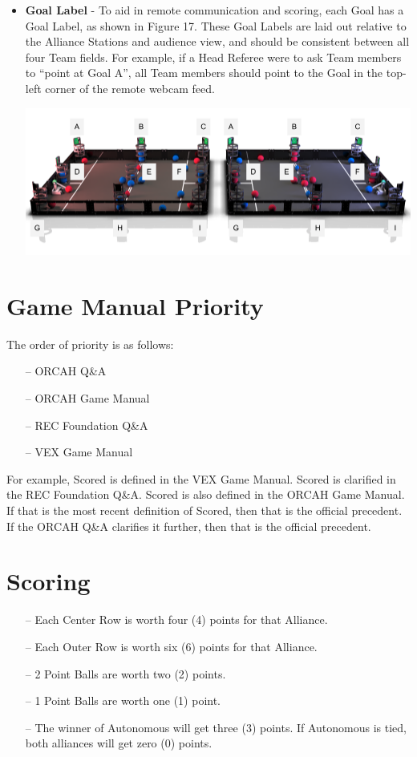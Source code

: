 \documentclass[letterpaper, 12pt]{article}
\begin{document}
\begin{itemize}[label={}]
\item\textbf{Goal Label} - To aid in remote communication and scoring, each Goal has a Goal Label, as shown in Figure 17. These Goal Labels are laid out relative to the Alliance Stations and audience view, and should be consistent between all four Team fields. For example, if a Head Referee were to ask Team members to “point at Goal A”, all Team members should point to the Goal in the top-left corner of the remote webcam feed.

\begin{center}
\includegraphics[scale=0.5]{labels}
\end{center}

\end{itemize}

\section{Game Manual Priority}

The order of priority is as follows:
\begin{itemize}
\item[--] ORCAH Q\&A
\item[--] ORCAH Game Manual
\item[--] REC Foundation Q\&A
\item[--] VEX Game Manual
\end{itemize}

For example, Scored is defined in the VEX Game Manual.  Scored is clarified in the REC Foundation Q\&A.  Scored is also defined in the ORCAH Game Manual.  If that is the most recent definition of Scored, then that is the official precedent.  If the ORCAH Q\&A clarifies it further, then that is the official precedent.

\section{Scoring}
\begin{itemize}
\item[--] Each Center Row is worth four (4) points for that Alliance.
\item[--] Each Outer Row is worth six (6) points for that Alliance.
\item[--] 2 Point Balls are worth two (2) points.
\item[--] 1 Point Balls are worth one (1) point.
\item[--] The winner of Autonomous will get three (3) points.  If Autonomous is tied, both alliances will get zero (0) points.
\end{itemize}
\end{document}
